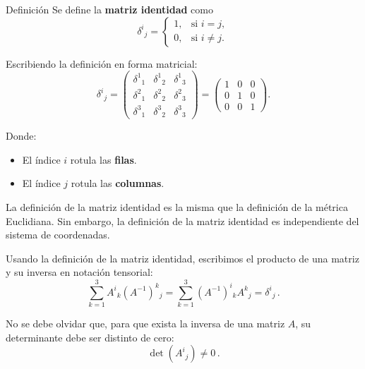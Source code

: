 \documentclass[../apunte_mecanica_clasica.tex]{subfiles}%
\begin{document}
\begin{apuntebloque}{Definición}
Se define la \textbf{matriz identidad} como
\begin{equation*}
\delta^i{}_j =
\begin{cases}
    1, & \text{si } i = j, \\[6pt]
    0, & \text{si } i \neq j.
\end{cases}
\end{equation*}
\end{apuntebloque}

Escribiendo la definición en forma matricial:
\begin{equation*}
    \delta^i{}_j =
    \begin{pmatrix}
        \delta^1{}_1 & \delta^1{}_2 & \delta^1{}_3 \\
        \delta^2{}_1 & \delta^2{}_2 & \delta^2{}_3 \\
        \delta^3{}_1 & \delta^3{}_2 & \delta^3{}_3
    \end{pmatrix}
    =
    \begin{pmatrix}
        1 & 0 & 0 \\
        0 & 1 & 0 \\
        0 & 0 & 1
    \end{pmatrix}.
\end{equation*}

Donde:
\begin{itemize}
    \item El índice $i$ rotula las \textbf{filas}.
    \item El índice $j$ rotula las \textbf{columnas}.
\end{itemize}

La definición de la matriz identidad es la misma que la definición de la 
métrica Euclidiana. Sin embargo, la definición de la matriz identidad es 
independiente del sistema de coordenadas.  

Usando la definición de la matriz identidad, escribimos el producto de una 
matriz y su inversa en notación tensorial:
\begin{equation*}
    \sum_{k=1}^3 A^i{}_k (A^{-1})^k{}_j
    = \sum_{k=1}^3 (A^{-1})^i{}_k A^k{}_j
    = \delta^i{}_j \,.
\end{equation*}

No se debe olvidar que, para que exista la inversa de una matriz $A$, su 
determinante debe ser distinto de cero:
\begin{equation*}
    \det(A^i{}_j) \neq 0 \,.
\end{equation*}
\end{document}
